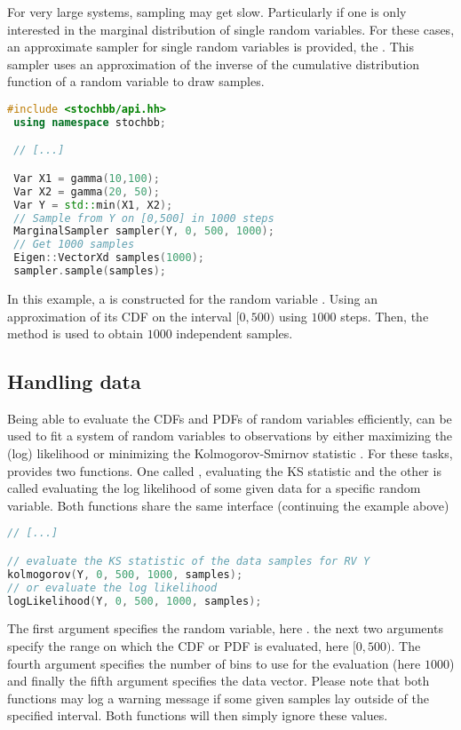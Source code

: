 For very large systems, sampling may get slow. Particularly if one is only interested
in the marginal distribution of single random variables. For these cases, an approximate sampler
for single random variables is provided, the . This sampler uses an
approximation of the inverse of the cumulative distribution function of a random variable
to draw samples.
\begin{lstlisting}[language=C++]
 #include <stochbb/api.hh>
 using namespace stochbb;

 // [...]

 Var X1 = gamma(10,100);
 Var X2 = gamma(20, 50);
 Var Y = std::min(X1, X2);
 // Sample from Y on [0,500] in 1000 steps
 MarginalSampler sampler(Y, 0, 500, 1000);
 // Get 1000 samples
 Eigen::VectorXd samples(1000);
 sampler.sample(samples);
\end{lstlisting}

In this example, a  is constructed for the random variable . Using an
approximation of its CDF on the interval $[0,500)$ using $1000$ steps. Then, the
 method is used to obtain $1000$ independent samples.

\subsection{Handling data}
Being able to evaluate the CDFs and PDFs of random variables efficiently,  can be used to fit a system of random variables to observations by either maximizing the (log) likelihood or minimizing the Kolmogorov-Smirnov statistic \cite[KS; e.g.,][]{Marsaglia2003}. For these tasks,  provides two functions. One called , evaluating the KS statistic and the other is called  evaluating the log likelihood of some given data for a specific random variable. Both functions share the same interface (continuing the example above)

\begin{lstlisting}[language=C++]
// [...]

// evaluate the KS statistic of the data samples for RV Y
kolmogorov(Y, 0, 500, 1000, samples);
// or evaluate the log likelihood
logLikelihood(Y, 0, 500, 1000, samples);
\end{lstlisting}

The first argument specifies the random variable, here . the next two arguments specify the range on which the CDF or PDF is evaluated, here $[0,500)$. The fourth argument specifies the number of bins to use for the evaluation (here $1000$) and finally the fifth argument specifies the data vector. Please note that both functions may log a warning message if some given samples lay outside of the specified interval. Both functions will then simply ignore these values.